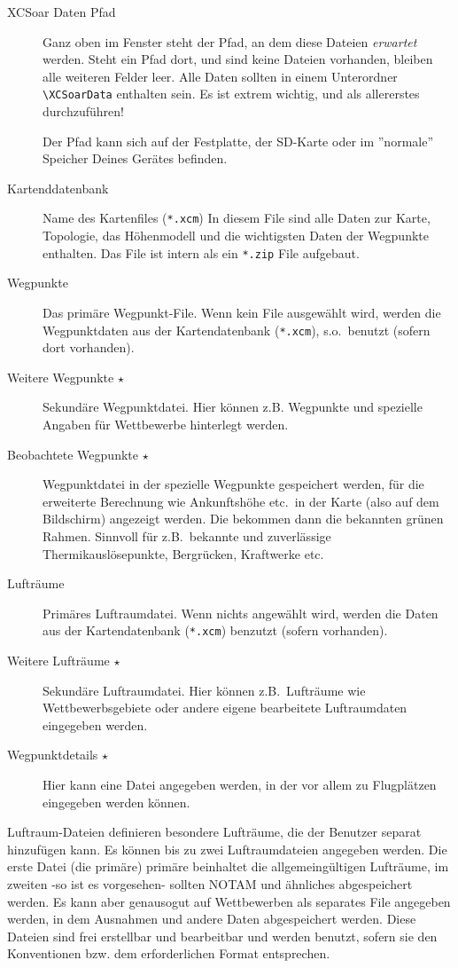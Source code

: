 \begin{description}
\item[XCSoar Daten Pfad]  Ganz oben im Fenster steht der Pfad, an dem diese Dateien \textsl{erwartet} werden.
Steht ein Pfad dort, und sind keine Dateien vorhanden, bleiben alle weiteren Felder leer.
Alle Daten sollten in einem Unterordner\verb" \XCSoarData" enthalten sein.
Es ist extrem wichtig, und als allererstes durchzuführen!

Der Pfad kann sich auf der Festplatte, der SD-Karte oder im ''normale'' Speicher
Deines Gerätes befinden.
\item[Kartenddatenbank]  Name des Kartenfiles (\verb"*.xcm") In diesem File sind alle Daten zur
Karte, Topologie, das Höhenmodell  und die wichtigsten Daten der Wegpunkte enthalten.
Das File ist intern als ein \verb"*.zip" File aufgebaut.
\item[Wegpunkte]  Das primäre Wegpunkt-File. Wenn kein File ausgewählt wird,
werden die Wegpunktdaten aus der Kartendatenbank (\verb"*.xcm"), s.o.\ benutzt
(sofern dort vorhanden).
\item[Weitere Wegpunkte $\star$]  Sekundäre Wegpunktdatei. Hier können z.B. Wegpunkte und spezielle
Angaben für Wettbewerbe hinterlegt werden.
\item[Beobachtete Wegpunkte $\star$]  Wegpunktdatei in der spezielle Wegpunkte gespeichert werden,
für die erweiterte Berechnung wie Ankunftshöhe etc.\  in der Karte (also auf dem Bildschirm)
angezeigt werden. Die bekommen dann die bekannten grünen Rahmen.
Sinnvoll für z.B.\ bekannte und zuverlässige Thermikauslösepunkte, Bergrücken, Kraftwerke etc.\
\item[Lufträume]  Primäres Luftraumdatei. Wenn nichts angewählt wird, werden die Daten aus der
Kartendatenbank (\verb"*.xcm") benzutzt (sofern vorhanden).
\item[Weitere Lufträume $\star$]  Sekundäre Luftraumdatei. Hier  können z.B.\ Lufträume wie
Wettbewerbsgebiete oder andere eigene bearbeitete Luftraumdaten  eingegeben werden.
\item[Wegpunktdetails $\star$]  Hier kann eine Datei angegeben werden, in der vor allem
 zu  Flugplätzen eingegeben werden können.
\end{description}

Luftraum-Dateien definieren besondere Lufträume, die der Benutzer separat hinzufügen
kann.\index{Luftraum!Angepaßte Dateien} Es können bis zu zwei Luftraumdateien
angegeben werden. Die erste Datei (die primäre) primäre beinhaltet die
allgemeingültigen Lufträume, im zweiten -so ist es vorgesehen- sollten NOTAM und ähnliches
abgespeichert werden. Es kann aber genausogut auf Wettbewerben als separates File
angegeben werden, in dem Ausnahmen und andere Daten abgespeichert werden.
\sketch{figures/config-site.png} Diese Dateien sind frei erstellbar und bearbeitbar und werden benutzt,
sofern sie den Konventionen bzw. dem erforderlichen Format entsprechen.


